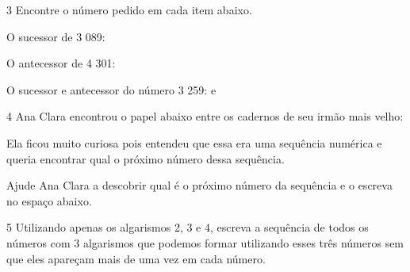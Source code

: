 
\num{3} Encontre o número pedido em cada item abaixo.

\begin{escolha}
\item
  O sucessor de 3 089: \preencher{}
\item
  O antecessor de 4 301: \preencher{}
\item
  O sucessor e antecessor do número 3 259: \preencher{} e \preencher{}
\end{escolha}


\num{4} Ana Clara encontrou o papel abaixo entre os cadernos de seu irmão mais velho:


Ela ficou muito curiosa pois entendeu que essa era uma sequência
numérica e queria encontrar qual o próximo número dessa sequência.

Ajude Ana Clara a descobrir qual é o próximo número da sequência e o
escreva no espaço abaixo.



\num{5} Utilizando apenas os algarismos 2, 3 e 4, escreva a sequência de
todos os números com 3 algarismos que podemos formar utilizando esses
três números sem que eles apareçam mais de uma vez em cada número.



